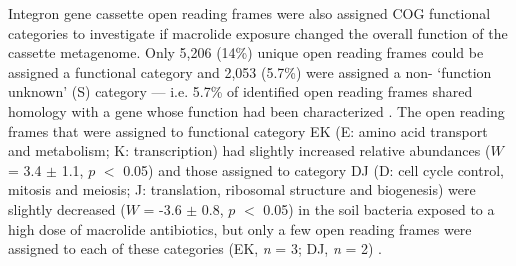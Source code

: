 
Integron gene cassette open reading frames were also assigned COG functional categories to investigate if macrolide exposure changed the overall function of the cassette metagenome.
Only 5,206 (14\%) unique open reading frames could be assigned a functional category and 2,053 (5.7\%) were assigned a non- ‘function unknown’ (S) category --- i.e. 5.7\% of identified open reading frames shared homology with a gene whose function had been characterized \dummysupfig.
The open reading frames that were assigned to functional category EK (E: amino acid transport and metabolism; K: transcription) had slightly increased relative abundances ($W$ = 3.4 $\pm$ 1.1, $p$ $<$ 0.05) and those assigned to category DJ (D: cell cycle control, mitosis and meiosis; J: translation, ribosomal structure and biogenesis) were slightly decreased ($W$ = -3.6 $\pm$ 0.8, $p$ $<$ 0.05) in the soil bacteria exposed to a high dose of macrolide antibiotics, but only a few open reading frames were assigned to each of these categories (EK, \textit{n} = 3; DJ, \textit{n} = 2) \dummysupfig.

